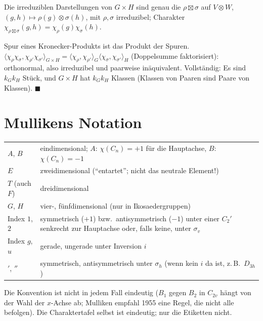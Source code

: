 \begin{merksatz}
Die irreduziblen Darstellungen von $G\times H$ sind genau die $\rho\boxtimes\sigma$ auf $V\otimes W$, $(g, h)\mapsto\rho(g)\otimes\sigma(h)$, mit $\rho, \sigma$ irreduzibel; Charakter $\chi_{\rho\boxtimes\sigma}(g, h) = \chi_\rho(g)\chi_\sigma(h)$.

Spur eines Kronecker-Produkts ist das Produkt der Spuren. $\langle\chi_\rho\chi_\sigma, \chi_{\rho'}\chi_{\sigma'}\rangle_{G\times H} = \langle\chi_\rho, \chi_{\rho'}\rangle_G\langle\chi_\sigma, \chi_{\sigma'}\rangle_H$ (Doppelsumme faktorisiert): orthonormal, also irreduzibel und paarweise inäquivalent. Vollständig: Es sind $k_Gk_H$ Stück, und $G\times H$ hat $k_Gk_H$ Klassen (Klassen von Paaren sind Paare von Klassen). $\blacksquare$
\end{merksatz}

\section{Mullikens Notation}

\begin{definition}
\begin{center}
{\small
\renewcommand{\arraystretch}{1.42}
\begin{tabular}{@{}P{1.6cm}P{7.0cm}@{}}
\toprule
$A$, $B$ & eindimensional; $A$: $\chi(C_n) = +1$ für die Hauptachse, $B$: $\chi(C_n) = -1$\\
$E$ & zweidimensional (\enquote{entartet}; nicht das neutrale Element!)\\
$T$ (auch $F$) & dreidimensional\\
$G$, $H$ & vier-, fünfdimensional (nur in Ikosaedergruppen)\\
Index $1$, $2$ & symmetrisch ($+1$) bzw.\ antisymmetrisch ($-1$) unter einer $C_2'$ senkrecht zur Hauptachse oder, falls keine, unter $\sigma_v$\\
Index $g$, $u$ & gerade, ungerade unter Inversion $i$\\
$'$, $''$ & symmetrisch, antisymmetrisch unter $\sigma_h$ (wenn kein $i$ da ist, z.\,B.\ $D_{3h}$)\\
\bottomrule
\end{tabular}}
\end{center}
Die Konvention ist nicht in jedem Fall eindeutig ($B_1$ gegen $B_2$ in $C_{2v}$ hängt von der Wahl der $x$-Achse ab; Mulliken empfahl 1955 eine Regel, die nicht alle befolgen). Die Charaktertafel selbst ist eindeutig; nur die Etiketten nicht.
\end{definition}

